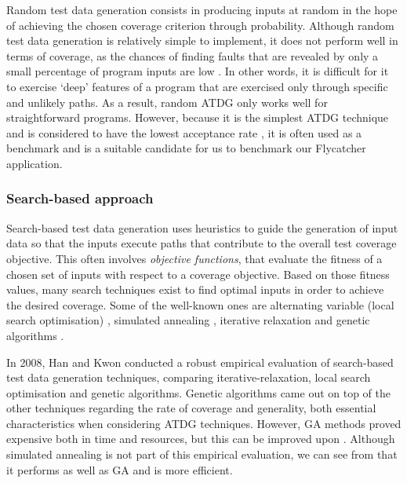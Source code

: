 \documentclass[a4paper,11pt,titlepage]{report}
\begin{document}
Random test data generation consists in producing inputs at random in the hope of achieving the chosen coverage criterion through probability. Although random test data generation is relatively simple to implement, it does not perform well in terms of coverage, as the chances of finding faults that are revealed by only a small percentage of program inputs are low \cite{edvardsson1999survey}. In other words, it is difficult for it to exercise `deep' features of a program that are exercised only through specific and unlikely paths. As a result, random ATDG only works well for straightforward programs. However, because it is the simplest ATDG technique and is considered to have the lowest acceptance rate \cite{edvardsson1999survey}, it is often used as a benchmark and is a suitable candidate for us to benchmark our Flycatcher application.

\subsubsection{Search-based approach}

Search-based test data generation uses heuristics to guide the generation of input data so that the inputs execute paths that contribute to the overall test coverage objective. This often involves \emph{objective functions}, that evaluate the fitness of a chosen set of inputs with respect to a coverage objective. Based on those fitness values, many search techniques exist to find optimal inputs in order to achieve the desired coverage. Some of the well-known ones are alternating variable (local search optimisation) \cite{korel1990automated, gallagher1997adtest}, simulated annealing \cite{tracey1998automated,tracey1998way}, iterative relaxation \cite{gupta1998automated} and genetic algorithms \cite{michael1998automated,michael2001generating}.
	
In 2008, Han and Kwon \cite{han2008empirical} conducted a robust empirical evaluation of search-based test data generation techniques, comparing iterative-relaxation, local search optimisation and genetic algorithms. Genetic algorithms came out on top of the other techniques regarding the rate of coverage and generality, both essential characteristics when considering ATDG techniques. However, GA methods proved expensive both in time and resources, but this can be improved upon \cite{han2008empirical}.
Although simulated annealing is not part of this empirical evaluation, we can see from \cite{michael1998automated} that it performs as well as GA and is more efficient.
\end{document}
